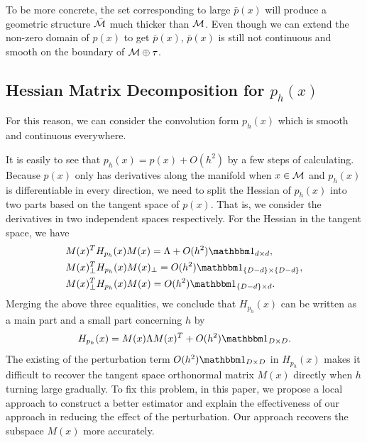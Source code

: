 \documentclass[aos,preprint]{imsart}
\theoremstyle{remark}
\begin{document}
To be more concrete, the set corresponding to large $\bar{p}(x)$ will produce a geometric structure $\bar{\cal M}$ much thicker than $\cal M$. Even though we can extend the non-zero domain of $p(x)$ to get $\bar{p}(x)$, $\bar{p}(x)$ is still not continuous and smooth on the boundary of $\cal M\oplus \tau$.

\subsection{Hessian Matrix Decomposition for $p_h(x)$}
For this reason, we can consider the convolution form $p_h(x)$ which is smooth and continuous everywhere.

It is easily to see that $p_h(x) = p(x)+O(h^2)$ by a few steps of calculating.
Because $p(x)$ only has derivatives along the manifold when $x\in \cal M$ and $p_h(x)$ is differentiable in every direction, we need to split the Hessian of $p_h(x)$ into two parts based on the tangent space of $p(x)$. That is, we consider the derivatives in two independent spaces respectively. For the Hessian in the tangent space, we have
\[
\begin{aligned}
 &M(x)^T H_{p_h}(x) M(x) =  \Lambda + O(h^2) \mathbbm 1_{d\times d},\\
 &M(x)_\perp^T H_{p_h}(x) M(x)_\perp  =  O(h^2) {\mathbbm 1}_{\{D-d\}\times \{D-d\}},\\
 &M(x)_\perp^T H_{p_h}(x) M(x) = O(h^2) {\mathbbm 1}_{\{D-d\}\times d}.
\end{aligned}
\]
Merging the above three equalities, we conclude that $H_{p_h}(x)$ can be written as a main part and a small part concerning $h$ by
\[
H_{p_h}(x) = M(x) \Lambda M(x)^T + O(h^2){\mathbbm 1}_{D\times D}.
\]
The existing of the perturbation term $O(h^2){\mathbbm 1}_{D\times D}$ in $H_{p_h}(x)$ makes it difficult to recover the tangent space orthonormal matrix $M(x)$ directly when $h$ turning large gradually. To fix this problem, in this paper, we propose a local approach to construct a better estimator and explain the effectiveness of our approach in reducing the effect of the perturbation. Our approach recovers the subspace $M(x)$ more accurately. 
\end{document}
